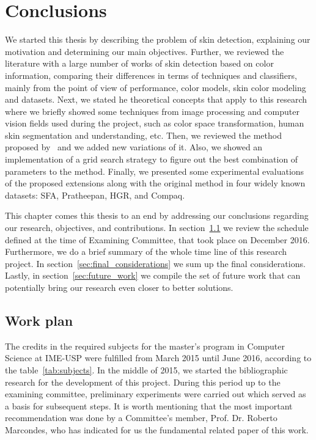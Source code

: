 \chapter{Conclusions}
\label{cap:conclusoes}

We started this thesis by describing the problem of skin detection, explaining our motivation and determining our main objectives. Further, we reviewed the literature with a large number of works of skin detection based on color information, comparing their differences in terms of techniques and classifiers, mainly from the point of view of performance, color models, skin color modeling and datasets. Next, we stated he theoretical concepts that apply to this research where we briefly showed some techniques from image processing and computer vision fields used during the project, such as color space transformation, human skin segmentation and understanding, etc. Then, we reviewed the method proposed by~\citet{brancati:17} and we added new variations of it. Also, we showed an implementation of a grid search strategy to figure out the best combination of parameters to the method. Finally, we presented some experimental evaluations of the proposed extensions along with the original method in four widely known datasets: SFA, Pratheepan, HGR, and Compaq.

This chapter comes this thesis to an end by addressing our conclusions regarding our research, objectives, and contributions. In section~\ref{sec:work_plan} we review the schedule defined at the time of Examining Committee, that took place on December 2016. Furthermore, we do a brief summary of the whole time line of this research project. In section~\ref{sec:final_considerations} we sum up the final considerations. Lastly, in section~\ref{sec:future_work} we compile the set of future work that can potentially bring our research even closer to better solutions.

\section{Work plan}
\label{sec:work_plan}

The credits in the required subjects for the master's program in Computer Science at IME-USP were fulfilled from March 2015 until June 2016, according to the table~\ref{tab:subjects}. In the middle of 2015, we started the bibliographic research for the development of this project. During this period up to the examining committee, preliminary experiments were carried out which served as a basis for subsequent steps. It is worth mentioning that the most important recommendation was done by a Committee's member, Prof. Dr. Roberto Marcondes, who has indicated for us the fundamental related paper of this work.


